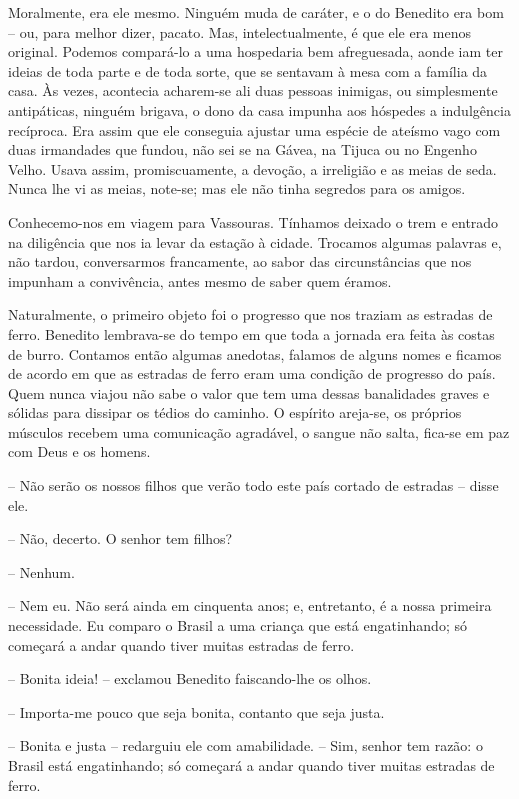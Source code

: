 Moralmente, era ele mesmo. Ninguém muda de caráter, e o do Benedito era
bom -- ou, para melhor dizer, pacato. Mas, intelectualmente, é que ele
era menos original. Podemos compará-lo a uma hospedaria bem afreguesada,
aonde iam ter ideias de toda parte e de toda sorte, que se sentavam à
mesa com a família da casa. Às vezes, acontecia acharem-se ali duas
pessoas inimigas, ou simplesmente antipáticas, ninguém brigava, o dono
da casa impunha aos hóspedes a indulgência recíproca. Era assim que ele
conseguia ajustar uma espécie de ateísmo vago com duas irmandades que
fundou, não sei se na Gávea, na Tijuca ou no Engenho Velho. Usava assim,
promiscuamente, a devoção, a irreligião e as meias de seda. Nunca lhe vi
as meias, note-se; mas ele não tinha segredos para os amigos.

Conhecemo-nos em viagem para Vassouras. Tínhamos deixado o trem e
entrado na diligência que nos ia levar da estação à cidade. Trocamos
algumas palavras e, não tardou, conversarmos francamente, ao sabor das
circunstâncias que nos impunham a convivência, antes mesmo de saber quem
éramos.

Naturalmente, o primeiro objeto foi o progresso que nos traziam as
estradas de ferro. Benedito lembrava-se do tempo em que toda a jornada
era feita às costas de burro. Contamos então algumas anedotas, falamos
de alguns nomes e ficamos de acordo em que as estradas de ferro eram uma
condição de progresso do país. Quem nunca viajou não sabe o valor que
tem uma dessas banalidades graves e sólidas para dissipar os tédios do
caminho. O espírito areja-se, os próprios músculos recebem uma
comunicação agradável, o sangue não salta, fica-se em paz com Deus e os
homens.

-- Não serão os nossos filhos que verão todo este país cortado de
estradas -- disse ele.

-- Não, decerto. O senhor tem filhos?

-- Nenhum.

-- Nem eu. Não será ainda em cinquenta anos; e, entretanto, é a nossa
primeira necessidade. Eu comparo o Brasil a uma criança que está
engatinhando; só começará a andar quando tiver muitas estradas de ferro.

-- Bonita ideia! -- exclamou Benedito faiscando-lhe os olhos.

-- Importa-me pouco que seja bonita, contanto que seja justa.

-- Bonita e justa -- redarguiu ele com amabilidade. -- Sim, senhor tem
razão: o Brasil está engatinhando; só começará a andar quando tiver
muitas estradas de ferro.

